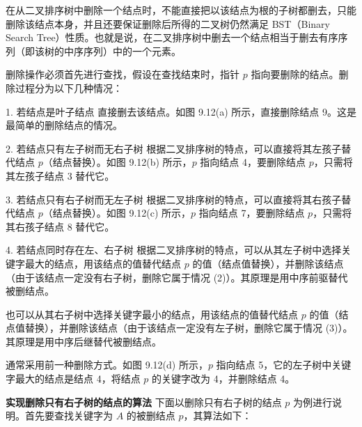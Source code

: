 \documentclass[lang=cn,newtx,10pt,scheme=chinese]{../elegantbook}
\begin{document}
在从二叉排序树中删除一个结点时，不能直接把以该结点为根的子树都删去，只能删除该结点本身，并且还要保证删除后所得的二叉树仍然满足 BST（Binary Search Tree）性质。也就是说，在二叉排序树中删去一个结点相当于删去有序序列（即该树的中序序列）中的一个元素。

删除操作必须首先进行查找，假设在查找结束时，指针 $p$ 指向要删除的结点。删除过程分为以下几种情况：

1. 若结点是叶子结点  
   直接删去该结点。如图 9.12(a) 所示，直接删除结点 9。这是最简单的删除结点的情况。

2. 若结点只有左子树而无右子树  
   根据二叉排序树的特点，可以直接将其左孩子替代结点 $p$（结点替换）。如图 9.12(b) 所示，$p$ 指向结点 4，要删除结点 $p$，只需将其左孩子结点 3 替代它。

3. 若结点只有右子树而无左子树  
   根据二叉排序树的特点，可以直接将其右孩子替代结点 $p$（结点替换）。如图 9.12(c) 所示，$p$ 指向结点 7，要删除结点 $p$，只需将其右孩子结点 8 替代它。

4. 若结点同时存在左、右子树  
   根据二叉排序树的特点，可以从其左子树中选择关键字最大的结点，用该结点的值替代结点 $p$ 的值（结点值替换），并删除该结点（由于该结点一定没有右子树，删除它属于情况 (2)）。其原理是用中序前驱替代被删结点。

   也可以从其右子树中选择关键字最小的结点，用该结点的值替代结点 $p$ 的值（结点值替换），并删除该结点（由于该结点一定没有左子树，删除它属于情况 (3)）。其原理是用中序后继替代被删结点。

   通常采用前一种删除方式。如图 9.12(d) 所示，$p$ 指向结点 5，它的左子树中关键字最大的结点是结点 4，将结点 $p$ 的关键字改为 4，并删除结点 4。



\textbf{实现删除只有右子树的结点的算法}  
下面以删除只有右子树的结点 $p$ 为例进行说明。首先要查找关键字为 $A$ 的被删结点 $p$，其算法如下：
\end{document}

